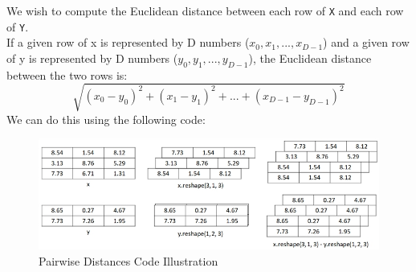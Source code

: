 \documentclass{book}
\begin{document}
We wish to compute the Euclidean distance between each row of \texttt{X} and each row of \texttt{Y}.\\
If a given row of x is represented by D numbers (\(x_0, x_1, ..., x_{D-1}\)) and a given row of y is represented by D numbers (\(y_0, y_1, ..., y_{D-1}\)), the Euclidean distance between the two rows is: \\
\[
    \sqrt{(x_0 - y_0)^2 + (x_1 - y_1)^2 + ... + (x_{D-1} - y_{D-1})^2}
\]
We can do this using the following code:
\begin{figure}[h]
    \centering
    \includegraphics[scale=0.47]{chapter 2/ch2_figure7.jpeg}
    \caption{Pairwise Distances Code Illustration}
\end{figure}
\newpage
\end{document}
